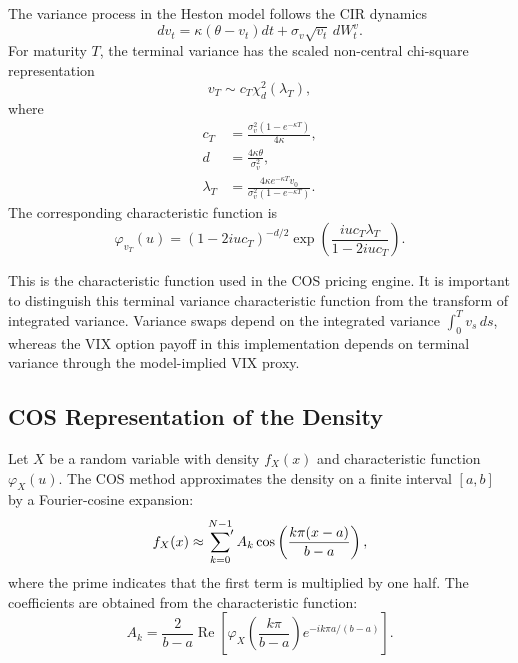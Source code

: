 The variance process in the Heston model follows the CIR dynamics
\begin{equation}
dv_t
=
\kappa(\theta-v_t)dt+\sigma_v\sqrt{v_t}\,dW_t^v.
\end{equation}
For maturity \(T\), the terminal variance has the scaled non-central chi-square representation
\begin{equation}
v_T
\sim
c_T\chi_d^2(\lambda_T),
\end{equation}
where
\begin{align}
c_T
&=
\frac{\sigma_v^2(1-e^{-\kappa T})}{4\kappa},\\
d
&=
\frac{4\kappa\theta}{\sigma_v^2},\\
\lambda_T
&=
\frac{4\kappa e^{-\kappa T}v_0}
{\sigma_v^2(1-e^{-\kappa T})}.
\end{align}
The corresponding characteristic function is
\begin{equation}
\boxed{
\varphi_{v_T}(u)
=
(1-2iu c_T)^{-d/2}
\exp\left(
\frac{iu c_T\lambda_T}{1-2iu c_T}
\right).
}
\label{eq:cos_terminal_cf}
\end{equation}

This is the characteristic function used in the COS pricing engine. It is important to distinguish this terminal variance characteristic function from the transform of integrated variance. Variance swaps depend on the integrated variance \(\int_0^T v_s\,ds\), whereas the VIX option payoff in this implementation depends on terminal variance through the model-implied VIX proxy.

\subsection{COS Representation of the Density}

Let \(X\) be a random variable with density \(f_X(x)\) and characteristic function \(\varphi_X(u)\). The COS method approximates the density on a finite interval \([a,b]\) by a Fourier-cosine expansion:
\begin{equation}
f_X(x)
\approx
\sideset{}{'}\sum_{k=0}^{N-1}
A_k
\cos\left(
\frac{k\pi(x-a)}{b-a}
\right),
\label{eq:cos_density_general}
\end{equation}
where the prime indicates that the first term is multiplied by one half. The coefficients are obtained from the characteristic function:
\begin{equation}
A_k
=
\frac{2}{b-a}
\operatorname{Re}
\left[
\varphi_X\left(\frac{k\pi}{b-a}\right)
e^{-ik\pi a/(b-a)}
\right].
\label{eq:cos_density_coefficients}
\end{equation}

